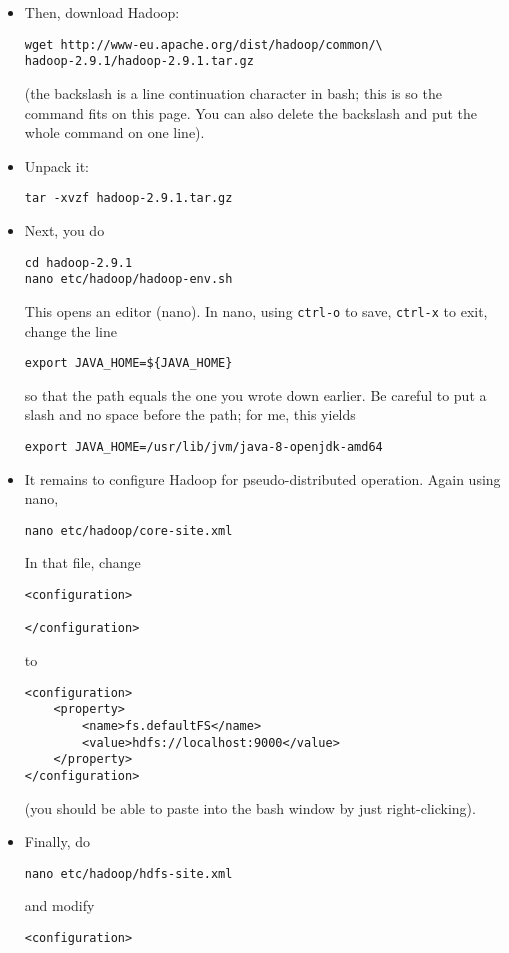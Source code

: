 \documentclass[11pt,a4paper]{article}
\begin{document}
\begin{itemize}
\item Then, download Hadoop:
\begin{verbatim}
wget http://www-eu.apache.org/dist/hadoop/common/\
hadoop-2.9.1/hadoop-2.9.1.tar.gz
\end{verbatim}
(the backslash is a line continuation character in bash; this is so the command fits on this page. You can also delete the backslash and put the whole command on one line).
\item Unpack it:
\begin{verbatim}
tar -xvzf hadoop-2.9.1.tar.gz
\end{verbatim}
\item Next, you do
\begin{verbatim}
cd hadoop-2.9.1
nano etc/hadoop/hadoop-env.sh
\end{verbatim}
This opens an editor (nano). In nano, using  \verb+ctrl-o+ to save, \verb+ctrl-x+ to exit, change the line
\begin{verbatim}
export JAVA_HOME=${JAVA_HOME}
\end{verbatim}
so that the path equals the one you wrote down earlier. Be careful to put a slash and no space before the path; for me, this yields
\begin{verbatim}
export JAVA_HOME=/usr/lib/jvm/java-8-openjdk-amd64
\end{verbatim}

\item It remains to configure Hadoop for pseudo-distributed operation. Again using nano,
\begin{verbatim}
nano etc/hadoop/core-site.xml
\end{verbatim}
In that file, change

\begin{verbatim}
<configuration>

</configuration>
\end{verbatim}
to
\begin{verbatim}
<configuration>
    <property>
        <name>fs.defaultFS</name>
        <value>hdfs://localhost:9000</value>
    </property>
</configuration>
\end{verbatim}
(you should be able to paste into the bash window by just right-clicking).
\item Finally, do
\begin{verbatim}
nano etc/hadoop/hdfs-site.xml
\end{verbatim}
and modify
\begin{verbatim}
<configuration>


\end{verbatim}
\end{itemize}
\end{document}
